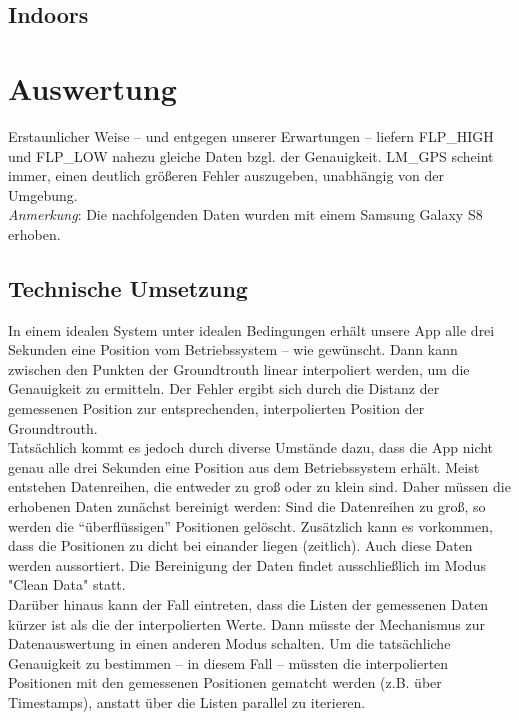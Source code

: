 \subsection{Indoors}


	
\section{Auswertung}	

Erstaunlicher Weise -- und entgegen unserer Erwartungen -- liefern FLP\_HIGH und FLP\_LOW nahezu gleiche Daten bzgl. der Genauigkeit. LM\_GPS scheint immer, einen deutlich größeren Fehler auszugeben, unabhängig von der Umgebung. \\

\textit{Anmerkung}: Die nachfolgenden Daten wurden mit einem Samsung Galaxy S8 erhoben.

\subsection{Technische Umsetzung}

In einem idealen System unter idealen Bedingungen erhält unsere App alle drei Sekunden eine Position vom Betriebssystem -- wie gewünscht. Dann kann zwischen den Punkten der Groundtrouth linear interpoliert werden, um die Genauigkeit zu ermitteln. Der Fehler ergibt sich durch die Distanz der gemessenen Position zur entsprechenden, interpolierten Position der Groundtrouth. \\

Tatsächlich kommt es jedoch durch diverse Umstände dazu, dass die App nicht genau alle drei Sekunden eine Position aus dem Betriebssystem erhält. Meist entstehen Datenreihen, die entweder zu groß oder zu klein sind. Daher müssen die erhobenen Daten zunächst bereinigt werden: Sind die Datenreihen zu groß, so werden die "`überflüssigen"' Positionen gelöscht. Zusätzlich kann es vorkommen, dass die Positionen zu dicht bei einander liegen (zeitlich). Auch diese Daten werden aussortiert. Die Bereinigung der Daten findet ausschließlich im Modus "Clean Data" statt. \\

Darüber hinaus kann der Fall eintreten, dass die Listen der gemessenen Daten kürzer ist als die der interpolierten Werte. Dann müsste der Mechanismus zur Datenauswertung in einen anderen Modus schalten. Um die tatsächliche Genauigkeit zu bestimmen -- in diesem Fall -- müssten die interpolierten Positionen mit den gemessenen Positionen gematcht werden (z.B. über Timestamps), anstatt über die Listen parallel zu iterieren.

